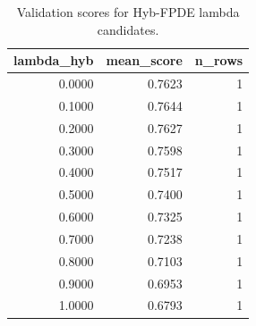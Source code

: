 \begin{table}[t]
\caption{Validation scores for Hyb-FPDE lambda candidates.}
\label{tab:lambda_distribution_computed}
\centering
\begin{tabular}{rrr}
\toprule
lambda\_hyb & mean\_score & n\_rows \\
\midrule
0.0000 & 0.7623 & 1 \\
0.1000 & 0.7644 & 1 \\
0.2000 & 0.7627 & 1 \\
0.3000 & 0.7598 & 1 \\
0.4000 & 0.7517 & 1 \\
0.5000 & 0.7400 & 1 \\
0.6000 & 0.7325 & 1 \\
0.7000 & 0.7238 & 1 \\
0.8000 & 0.7103 & 1 \\
0.9000 & 0.6953 & 1 \\
1.0000 & 0.6793 & 1 \\
\bottomrule
\end{tabular}

\end{table}
